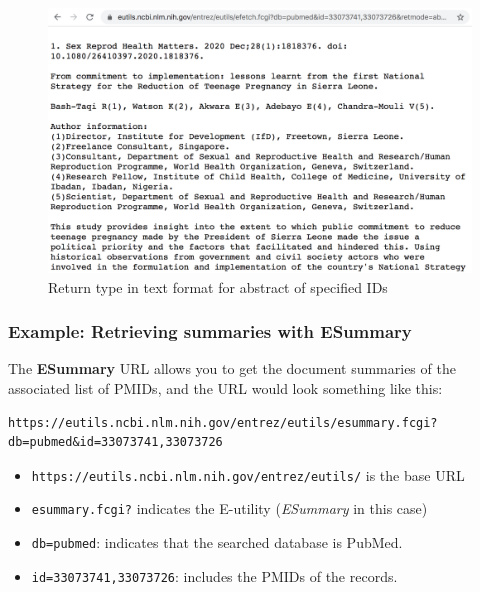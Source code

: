 \documentclass[
]{book}
\begin{document}
\begin{figure}

{\centering \includegraphics[width=0.8\linewidth]{images/api/pubmed-efetch} 

}

\caption{Return type in text format for abstract of specified IDs}\label{fig:unnamed-chunk-135}
\end{figure}

\hypertarget{example-retrieving-summaries-with-esummary}{%
\subsubsection*{Example: Retrieving summaries with ESummary}\label{example-retrieving-summaries-with-esummary}}

The \textbf{ESummary} URL allows you to get the document summaries of the associated
list of PMIDs, and the URL would look something like this:

\begin{verbatim}
https://eutils.ncbi.nlm.nih.gov/entrez/eutils/esummary.fcgi?db=pubmed&id=33073741,33073726
\end{verbatim}

\begin{itemize}
\item
  \texttt{https://eutils.ncbi.nlm.nih.gov/entrez/eutils/} is the base URL
\item
  \texttt{esummary.fcgi?} indicates the E-utility (\emph{ESummary} in this case)
\item
  \texttt{db=pubmed}: indicates that the searched database is PubMed.
\item
  \texttt{id=33073741,33073726}: includes the PMIDs of the records.
\end{itemize}
\end{document}
